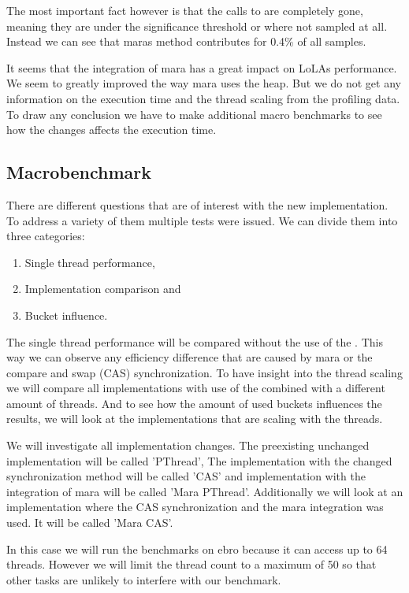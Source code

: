 The most important fact however is that the calls to  are completely gone, meaning they are under the significance threshold or where not sampled at all. Instead we can see that maras  method contributes for 0.4\% of all samples.

It seems that the integration of mara has a great impact on LoLAs performance. We seem to greatly improved the way mara uses the heap. But we do not get any information on the execution time and the thread scaling from the profiling data. To draw any conclusion we have to make additional macro benchmarks to see how the changes affects the execution time.

\subsection{Macrobenchmark}

There are different questions that are of interest with the new implementation. To address a variety of them multiple tests were issued. We can divide them into three categories:
\begin{enumerate}
    \item Single thread performance,
    \item Implementation comparison and
    \item Bucket influence.
\end{enumerate}
The single thread performance will be compared without the use of the . This way we can observe any efficiency difference that are caused by mara or the compare and swap (CAS) synchronization.
To have insight into the thread scaling we will compare all implementations with use of the  combined with a different amount of threads.
And to see how the amount of used buckets influences the results, we will look at the implementations that are scaling with the threads.

We will investigate all implementation changes. The preexisting unchanged implementation will be called 'PThread', The implementation with the changed synchronization method will be called 'CAS' and implementation with the integration of mara will be called 'Mara PThread'. Additionally we will look at an implementation where the CAS synchronization and the mara integration was used. It will be called 'Mara CAS'.

In this case we will run the benchmarks on ebro because it can access up to 64 threads. However we will limit the thread count to a maximum of 50 so that other tasks are unlikely to interfere with our benchmark.

